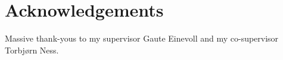 \documentclass[a4paper, UKenglish, 11pt]{uiomaster}
\begin{document}
\chapter{Acknowledgements}
Massive thank-yous to my supervisor Gaute Einevoll and my co-supervisor Torbjørn Ness.
\end{document}
